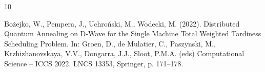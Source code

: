 \documentclass[12pt]{article}
\begin{document}
\begin{thebibliography}{10}

Bożejko, W., Pempera, J., Uchroński, M., Wodecki, M. (2022). Distributed Quantum Annealing on D-Wave for the Single Machine Total Weighted Tardiness Scheduling Problem. In: Groen, D., de Mulatier, C., Paszynski, M., Krzhizhanovskaya, V.V., Dongarra, J.J., Sloot, P.M.A. (eds) Computational Science – ICCS 2022. LNCS 13353, Springer, p. 171--178.


\end{thebibliography}
\end{document}
